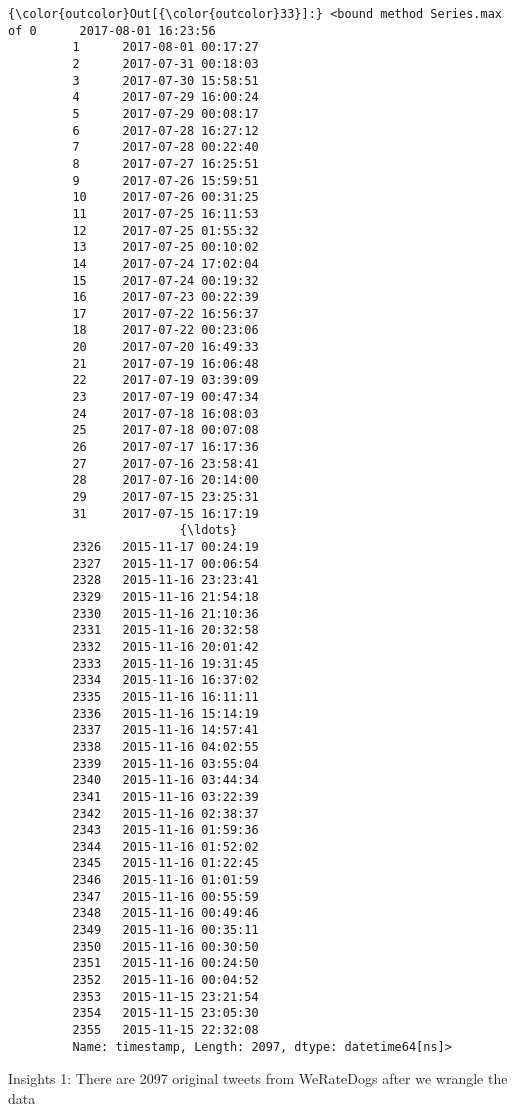 \documentclass[11pt]{article}
\begin{document}
\begin{Verbatim}[commandchars=\\\{\}]
{\color{outcolor}Out[{\color{outcolor}33}]:} <bound method Series.max of 0      2017-08-01 16:23:56
         1      2017-08-01 00:17:27
         2      2017-07-31 00:18:03
         3      2017-07-30 15:58:51
         4      2017-07-29 16:00:24
         5      2017-07-29 00:08:17
         6      2017-07-28 16:27:12
         7      2017-07-28 00:22:40
         8      2017-07-27 16:25:51
         9      2017-07-26 15:59:51
         10     2017-07-26 00:31:25
         11     2017-07-25 16:11:53
         12     2017-07-25 01:55:32
         13     2017-07-25 00:10:02
         14     2017-07-24 17:02:04
         15     2017-07-24 00:19:32
         16     2017-07-23 00:22:39
         17     2017-07-22 16:56:37
         18     2017-07-22 00:23:06
         20     2017-07-20 16:49:33
         21     2017-07-19 16:06:48
         22     2017-07-19 03:39:09
         23     2017-07-19 00:47:34
         24     2017-07-18 16:08:03
         25     2017-07-18 00:07:08
         26     2017-07-17 16:17:36
         27     2017-07-16 23:58:41
         28     2017-07-16 20:14:00
         29     2017-07-15 23:25:31
         31     2017-07-15 16:17:19
                        {\ldots}        
         2326   2015-11-17 00:24:19
         2327   2015-11-17 00:06:54
         2328   2015-11-16 23:23:41
         2329   2015-11-16 21:54:18
         2330   2015-11-16 21:10:36
         2331   2015-11-16 20:32:58
         2332   2015-11-16 20:01:42
         2333   2015-11-16 19:31:45
         2334   2015-11-16 16:37:02
         2335   2015-11-16 16:11:11
         2336   2015-11-16 15:14:19
         2337   2015-11-16 14:57:41
         2338   2015-11-16 04:02:55
         2339   2015-11-16 03:55:04
         2340   2015-11-16 03:44:34
         2341   2015-11-16 03:22:39
         2342   2015-11-16 02:38:37
         2343   2015-11-16 01:59:36
         2344   2015-11-16 01:52:02
         2345   2015-11-16 01:22:45
         2346   2015-11-16 01:01:59
         2347   2015-11-16 00:55:59
         2348   2015-11-16 00:49:46
         2349   2015-11-16 00:35:11
         2350   2015-11-16 00:30:50
         2351   2015-11-16 00:24:50
         2352   2015-11-16 00:04:52
         2353   2015-11-15 23:21:54
         2354   2015-11-15 23:05:30
         2355   2015-11-15 22:32:08
         Name: timestamp, Length: 2097, dtype: datetime64[ns]>
\end{Verbatim}
            
    Insights 1: There are 2097 original tweets from WeRateDogs after we
wrangle the data
\end{document}
